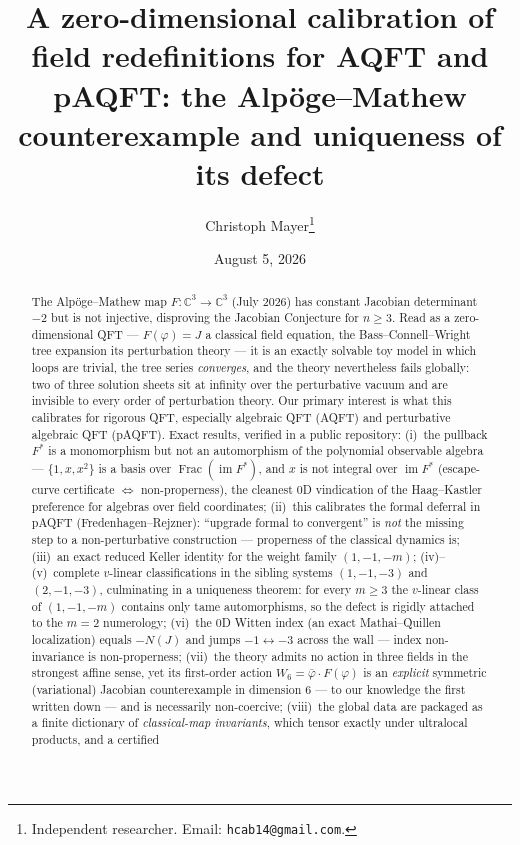 \documentclass[11pt]{article}
\title{A zero-dimensional calibration of field redefinitions for AQFT
and pAQFT: the Alp\"oge--Mathew counterexample and uniqueness of its
defect}
\author{Christoph Mayer\thanks{Independent researcher.
Email: \texttt{hcab14@gmail.com}.}}
\date{August 5, 2026}
\theoremstyle{definition}
\theoremstyle{remark}
\newcommand{\C}{\mathbb{C}}
\newcommand{\im}{\operatorname{im}}
\newcommand{\Frac}{\operatorname{Frac}}
\begin{document}
\maketitle

\begin{abstract}
The Alp\"oge--Mathew map $F:\C^3\to\C^3$ (July 2026) has constant
Jacobian determinant $-2$ but is not injective, disproving the Jacobian
Conjecture for $n\ge 3$. Read as a zero-dimensional QFT ---
$F(\varphi)=J$ a classical field equation, the Bass--Connell--Wright
tree expansion its perturbation theory --- it is an exactly solvable
toy model in which loops are trivial, the tree series \emph{converges},
and the theory nevertheless fails globally: two of three solution
sheets sit at infinity over the perturbative vacuum and are invisible
to every order of perturbation theory. Our primary interest is what
this calibrates for rigorous QFT, especially algebraic QFT (AQFT) and
perturbative algebraic QFT (pAQFT). Exact results, verified in a public
repository: (i)~the pullback $F^*$ is a monomorphism but not an
automorphism of the polynomial observable algebra --- $\{1,x,x^2\}$ is
a basis over $\Frac(\im F^*)$, and $x$ is not integral over $\im F^*$
(escape-curve certificate $\Leftrightarrow$ non-properness), the
cleanest 0D vindication of the Haag--Kastler preference for algebras
over field coordinates; (ii)~this calibrates the formal deferral in
pAQFT (Fredenhagen--Rejzner): ``upgrade formal to convergent'' is
\emph{not} the missing step to a non-perturbative construction ---
properness of the classical dynamics is; (iii)~an exact reduced Keller
identity for the weight family $(1,-1,-m)$; (iv)--(v)~complete
$v$-linear classifications in the sibling systems $(1,-1,-3)$ and
$(2,-1,-3)$, culminating in a uniqueness theorem: for every $m\ge 3$
the $v$-linear class of $(1,-1,-m)$ contains only tame automorphisms,
so the defect is rigidly attached to the $m=2$ numerology;
(vi)~the 0D Witten index (an exact Mathai--Quillen localization)
equals $-N(J)$ and jumps $-1\leftrightarrow-3$ across the wall ---
index non-invariance is non-properness; (vii)~the theory admits no
action in three fields in the strongest affine sense, yet its
first-order action $W_6=\bar\varphi\cdot F(\varphi)$ is an
\emph{explicit} symmetric (variational) Jacobian counterexample in
dimension 6 --- to our knowledge the first written down --- and is
necessarily non-coercive; (viii)~the global data are packaged as a
finite dictionary of \emph{classical-map invariants}, which tensor
exactly under ultralocal products, and a certified

\end{abstract}
\end{document}

